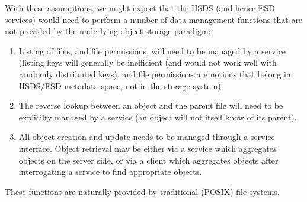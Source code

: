 With these assumptions, we might expect that the HSDS (and hence ESD services) would need to perform a number of data management functions that are not provided by the underlying object storage paradigm:
\begin{enumerate} [resume]
    \item Listing of files, and file permissions, will need to be managed by a service (listing keys will generally be inefficient (and would not work well with randomly distributed keys), and file permissions are notions that belong in HSDS/ESD metadata space, not in the storage system).
    \item The reverse lookup between an object and the parent file will need to be explicilty managed by a service (an object will not itself know of its parent).
    \item All object creation and update needs to be managed through a service interface. Object retrieval may be either via a service which aggregates objects on the server side, or via a client which aggregates objects after interrogating a service to find appropriate objects.
\end{enumerate}
These functions are naturally provided by traditional (POSIX) file systems.

